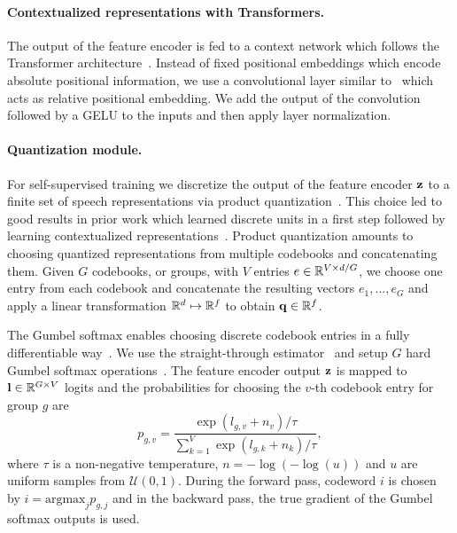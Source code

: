 \documentclass{article}
\begin{document}
\paragraph{Contextualized representations with Transformers.}
The output of the feature encoder is fed to a context network which follows the Transformer architecture~\cite{vaswani2017transformer,devlin2018bert,liu2019roberta}. 
Instead of fixed positional embeddings which encode absolute positional information, we use a convolutional layer similar to~\cite{mohamed2019libri,baevski2019effectiveness,wu2019pay} which acts as relative positional embedding.
We add the output of the convolution followed by a GELU to the inputs and then apply layer normalization.


\paragraph{Quantization module.} 
For self-supervised training we discretize the output of the feature encoder $\mathbf{z}$ to a finite set of speech representations via product quantization~\citep{jegou2011ieee}.
This choice led to good results in prior work which learned discrete units in a first step followed by learning contextualized representations~\cite{baevski2019vqwav2vec}.
Product quantization amounts to choosing quantized representations from multiple codebooks and concatenating them. 
Given $G$ codebooks, or groups, with $V$ entries $e \in \mathbb{R}^{V \times d/G}$, we choose one entry from each codebook and concatenate the resulting vectors $e_1, \dots, e_G$ and apply a linear transformation $\mathbb{R}^d \mapsto \mathbb{R}^f$ to obtain $\mathbf{q} \in \mathbb{R}^f$.

The Gumbel softmax enables choosing discrete codebook entries in a fully differentiable way~\citep{gumbel1954statistical,jang2016gumbel,maddison2014sampling}. 
We use the straight-through estimator~\citep{jiang2019improving} and setup $G$ hard Gumbel softmax operations~\citep{jang2016gumbel}. 
The feature encoder output $\mathbf{z}$ is mapped to $\mathbf{l} \in \mathbb{R}^{G \times V}$ logits and the probabilities for choosing the $v$-th codebook entry for group $g$ are
\begin{equation}
    p_{g,v} = \frac{\exp(l_{g,v} + n_v)/\tau}{\sum_{k = 1}^{V} \exp(l_{g,k} + n_k)/\tau}, %
\label{eq:gumbel}
\end{equation}
where $\tau$ is a non-negative temperature, $n = -\log(-\log(u))$ and $u$ are uniform samples from $\mathcal{U}(0, 1)$.
During the forward pass, codeword $i$ is chosen by $i = \text{argmax}_j p_{g,j}$ and in the backward pass, the true gradient of the Gumbel softmax outputs is used.
\end{document}
